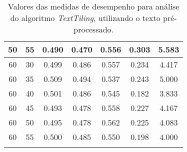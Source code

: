 \begin{longtable}[c]{|c|c|c|c|c|c|c|}
 50 & 55 & 0.490 & 0.470 & 0.556 & 0.303 & 5.583  \\ \hline 
 60 & 30 & 0.499 & 0.486 & 0.557 & 0.234 & 4.417  \\ \hline 
 60 & 35 & 0.509 & 0.494 & 0.537 & 0.243 & 5.000  \\ \hline 
 60 & 40 & 0.501 & 0.486 & 0.545 & 0.182 & 3.833  \\ \hline 
 60 & 45 & 0.493 & 0.478 & 0.558 & 0.227 & 4.167  \\ \hline 
 60 & 50 & 0.495 & 0.478 & 0.562 & 0.225 & 4.083  \\ \hline 
 60 & 55 & 0.500 & 0.485 & 0.550 & 0.198 & 4.000  \\ \hline 
 \caption{Valores das medidas de desempenho para análise do algoritmo \textit{TextTiling}, utilizando o texto pré-processado.}
 \end{longtable} 


 \newpage



